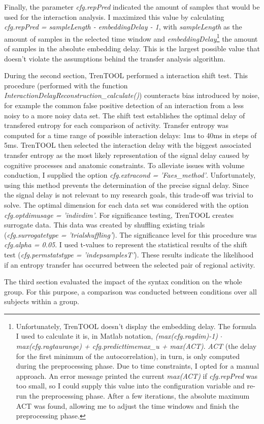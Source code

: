 Finally, the parameter \emph{cfg.repPred} indicated the amount of samples that would be used for the interaction analysis.
I maximized this value by calculating \emph{cfg.repPred = sampleLength - embeddingDelay - 1}, with \emph{sampleLength} as the amount of samples in the selected time window and \emph{embeddingDelay}\footnote{Unfortunately, TrenTOOL doesn't display the embedding delay. The formula I used to calculate it is, in Matlab notation, \emph{(max(cfg.ragdim)-1) $\cdot$ max(cfg.ragtaurange) + cfg.predicttimemax\_u + max(ACT)}. \emph{ACT} (the delay for the first minimum of the autocorrelation), in turn, is only computed during the preprocessing phase. Due to time constraints, I opted for a manual approach. An error message printed the current \emph{max(ACT)} if \emph{cfg.repPred} was too small, so I could supply this value into the configuration variable and re-run the preprocessing phase. After a few iterations, the absolute maximum ACT was found, allowing me to adjust the time windows and finish the preprocessing phase.} the amount of samples in the absolute embedding delay.
This is the largest possible value that doesn't violate the assumptions behind the transfer analysis algorithm.


During the second section, TrenTOOL performed a interaction shift test.
This procedure (performed with the function \emph{InteractionDelayReconstruction\_calculate()}) counteracts bias introduced by noise, for example the common false positive detection of an interaction from a less noisy to a more noisy data set.
The shift test establishes the optimal delay of transfered entropy for each comparison of activity.
Transfer entropy was computed for a time range of possible interaction delays: 1ms to 40ms in steps of 5ms.
TrenTOOL then selected the interaction delay with the biggest associated transfer entropy as the most likely representation of the signal delay caused by cognitive processes and anatomic constraints.
To alleviate issues with volume conduction, I supplied the option \emph{cfg.extracond = 'Faes\_method'}.
Unfortunately, using this method prevents the determination of the precise signal delay.
Since the signal delay is not relevant to my research goals, this trade-off was trivial to solve.
The optimal dimension for each data set was considered with the option \emph{cfg.optdimusage = 'indivdim'}.
For significance testing, TrenTOOL creates surrogate data.
This data was created by shuffling existing trials (\emph{cfg.surrogatetype = 'trialshuffling'}).
The significance level for this procedure was \emph{cfg.alpha = 0.05}.
I used t-values to represent the statistical results of the shift test (\emph{cfg.permstatstype = 'indepsamplesT'}).
These results indicate the likelihood if an entropy transfer has occurred between the selected pair of regional activity.


The third section evaluated the impact of the syntax condition on the whole group.
For this purpose, a comparison was conducted between conditions over all subjects within a group.
